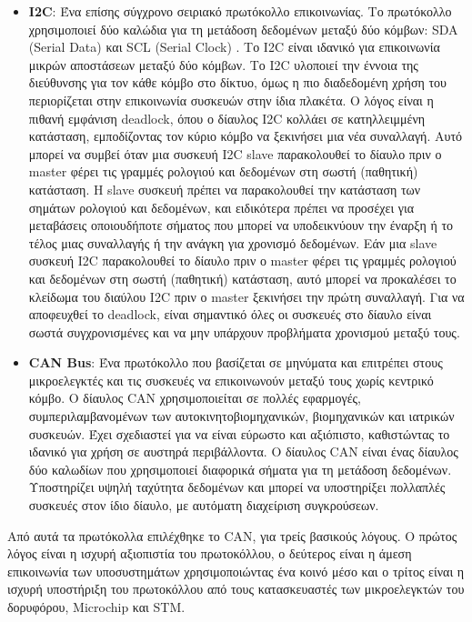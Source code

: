 \documentclass[a4paper,nobib,justified]{tufte-book}
\begin{document}
\begin{itemize}
	\item \textbf{I2C}: Ένα επίσης σύγχρονο σειριακό πρωτόκολλο επικοινωνίας. Το πρωτόκολλο χρησιμοποιεί δύο καλώδια για τη μετάδοση δεδομένων μεταξύ δύο κόμβων: SDA (Serial Data) και SCL (Serial Clock) . Το I2C είναι ιδανικό για επικοινωνία μικρών αποστάσεων μεταξύ δύο κόμβων. Το I2C υλοποιεί την έννοια της διεύθυνσης για τον κάθε κόμβο στο δίκτυο, όμως η πιο διαδεδομένη χρήση του περιορίζεται στην επικοινωνία συσκευών στην ίδια πλακέτα. Ο λόγος είναι η πιθανή εμφάνιση deadlock, όπου ο δίαυλος I2C κολλάει σε κατηλλειμμένη κατάσταση, εμποδίζοντας τον κύριο κόμβο να ξεκινήσει μια νέα συναλλαγή. Αυτό μπορεί να συμβεί όταν μια συσκευή I2C slave παρακολουθεί το δίαυλο πριν ο master φέρει τις γραμμές ρολογιού και δεδομένων στη σωστή (παθητική) κατάσταση. Η slave συσκευή πρέπει να παρακολουθεί την κατάσταση των σημάτων ρολογιού και δεδομένων, και ειδικότερα πρέπει να προσέχει για μεταβάσεις οποιουδήποτε σήματος που μπορεί να υποδεικνύουν την έναρξη ή το τέλος μιας συναλλαγής ή την ανάγκη για χρονισμό δεδομένων. Εάν μια slave συσκευή I2C παρακολουθεί το δίαυλο πριν ο master φέρει τις γραμμές ρολογιού και δεδομένων στη σωστή (παθητική) κατάσταση, αυτό μπορεί να προκαλέσει το κλείδωμα του διαύλου I2C πριν ο master ξεκινήσει την πρώτη συναλλαγή. Για να αποφευχθεί το deadlock, είναι σημαντικό όλες οι συσκευές στο δίαυλο είναι σωστά συγχρονισμένες και να μην υπάρχουν προβλήματα χρονισμού μεταξύ τους. 
	\item \textbf{CAN Bus}: Ένα πρωτόκολλο που βασίζεται σε μηνύματα και επιτρέπει στους μικροελεγκτές και τις συσκευές να επικοινωνούν μεταξύ τους χωρίς κεντρικό κόμβο. Ο δίαυλος CAN χρησιμοποιείται σε πολλές εφαρμογές, συμπεριλαμβανομένων των αυτοκινητοβιομηχανικών, βιομηχανικών και ιατρικών συσκευών. Έχει σχεδιαστεί για να είναι εύρωστο και αξιόπιστο, καθιστώντας το ιδανικό για χρήση σε αυστηρά περιβάλλοντα. Ο δίαυλος CAN είναι ένας δίαυλος δύο καλωδίων που χρησιμοποιεί διαφορικά σήματα για τη μετάδοση δεδομένων. Υποστηρίζει υψηλή ταχύτητα δεδομένων και μπορεί να υποστηρίξει πολλαπλές συσκευές στον ίδιο δίαυλο, με αυτόματη διαχείριση συγκρούσεων. 
\end{itemize}

Από αυτά τα πρωτόκολλα επιλέχθηκε το \acs{CAN}, για τρείς βασικούς λόγους. Ο πρώτος λόγος είναι η ισχυρή αξιοπιστία του πρωτοκόλλου, ο δεύτερος είναι η άμεση επικοινωνία των υποσυστημάτων χρησιμοποιώντας ένα κοινό μέσο και ο τρίτος είναι η ισχυρή υποστήριξη του πρωτοκόλλου από τους κατασκευαστές των μικροελεγκτών του δορυφόρου, Microchip και STM.
\end{document}
